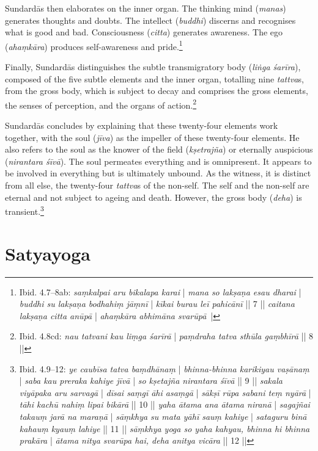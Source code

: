 Sundardās then elaborates on the inner organ. The thinking mind (\textit{manas}) generates thoughts and doubts. The intellect (\textit{buddhi}) discerns and recognises what is good and bad. Consciousness (\textit{citta}) generates awareness. The ego (\textit{ahaṃkāra}) produces self-awareness and pride.\footnote{Ibid. 4.7–8ab: \textit{saṃkalpai aru bikalapa karai} | \textit{mana so lakṣaṇa esau dharai} | \textit{buddhi su lakṣaṇa bodhahiṃ jāṃnī} | \textit{kīkai burau leī pahicānī} || 7 || \textit{caitana lakṣaṇa citta anūpā} | \textit{ahaṃkāra abhimāna svarūpā}~|}

Finally, Sundardās distinguishes the subtle transmigratory body (\textit{liṅga śarīra}), composed of the five subtle elements and the inner organ, totalling nine \textit{tattva}s, from the gross body, which is subject to decay and comprises the gross elements, the senses of perception, and the organs of action.\footnote{Ibid. 4.8cd: \textit{nau tatvani kau liṃga śarīrā} | \textit{paṃdraha tatva sthūla gaṃbhīrā} || 8 ||}

Sundardās concludes by explaining that these twenty-four elements work together, with the soul (\textit{jīva}) as the impeller of these twenty-four elements. He also refers to the soul as the knower of the field (\textit{kṣetrajña}) or eternally auspicious (\textit{nirantara śīvā}). The soul permeates everything and is omnipresent. It appears to be involved in everything but is ultimately unbound. As the witness, it is distinct from all else, the twenty-four \textit{tattva}s of the non-self. The self and the non-self are eternal and not subject to ageing and death. However, the gross body (\textit{deha}) is transient.\footnote{Ibid. 4.9–12: \textit{ye caubīsa tatva baṃdhānaṃ} | \textit{bhinna-bhinna karikiyau vaṣānaṃ} | \textit{saba kau preraka kahiye jīvā} | \textit{so kṣetajña nirantara śīvā} || 9 || \textit{sakala viyāpaka aru sarvagā} | \textit{dīsai saṃgī āhi asaṃgā} | \textit{sākṣī rūpa sabani teṃ nyārā} | \textit{tāhi kachū nahiṃ lipai bikārā} || 10 || \textit{yaha ātama ana ātama niranā} | \textit{sagajñai takauṃ jarā na maraṇā} | \textit{sāṃkhya su mata yāhī sauṃ kahiye} | \textit{sataguru binā kahauṃ kyauṃ lahiye} || 11 || \textit{sāṃkhya yoga so yaha kahyau, bhinna hi bhinna prakāra} | \textit{ātama nitya svarūpa hai, deha anitya vicāra} || 12 ||}

\section{Satyayoga}
\label{satyayoga}

